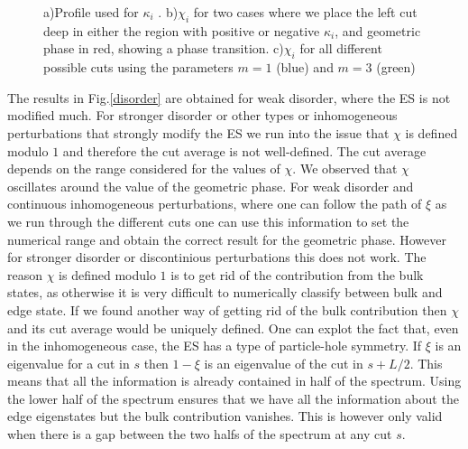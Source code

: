 \documentclass[twocolumn,amsmath,longbibliography,amssymb,superscriptaddress]{revtex4-1}
\begin{document}
\begin{figure}[h!]
\centering
{}\hspace{0mm}



\caption{a)Profile used for $\kappa_i$ . b)$\chi_i$ for two cases where we place the left cut deep in either the region with positive or negative $\kappa_i$, and geometric phase in red, showing a phase transition. c)$\chi_i$ for all different possible cuts using the parameters $m=1$ (blue) and $m=3$ (green)}
\label{cuts}
\end{figure}

The results in Fig.\ref{disorder} are obtained for weak disorder, where the ES is not modified much. For stronger disorder or other types or inhomogeneous perturbations that strongly modify the ES we run into the issue that $\chi$ is defined modulo $1$ and therefore the cut average is not well-defined. The cut average depends on the range considered for the values of $\chi$. We observed that $\chi$ oscillates around the value of the geometric phase. For weak disorder and continuous inhomogeneous perturbations, where one can follow the path of $\xi$ as we run through the different cuts one can use this information to set the numerical range and obtain the correct result for the geometric phase. However for stronger disorder or discontinious perturbations this does not work. The reason $\chi$ is defined modulo $1$ is to get rid of the contribution from the bulk states, as otherwise it is very difficult to numerically classify between bulk and edge state. If we found another way of getting rid of the bulk contribution then $\chi$ and its cut average would be uniquely defined. 
One can explot the fact that, even in the inhomogeneous case, the ES has a type of particle-hole symmetry. If $\xi$ is an eigenvalue for a cut in $s$ then $1-\xi$ is an eigenvalue of the cut in $s+L/2$. This means that all the information is already contained in half of the spectrum. Using the lower half of the spectrum ensures that we have all the information about the edge eigenstates but the bulk contribution vanishes. This is however only valid when there is a gap between the two halfs of the spectrum at any cut $s$.
\end{document}
